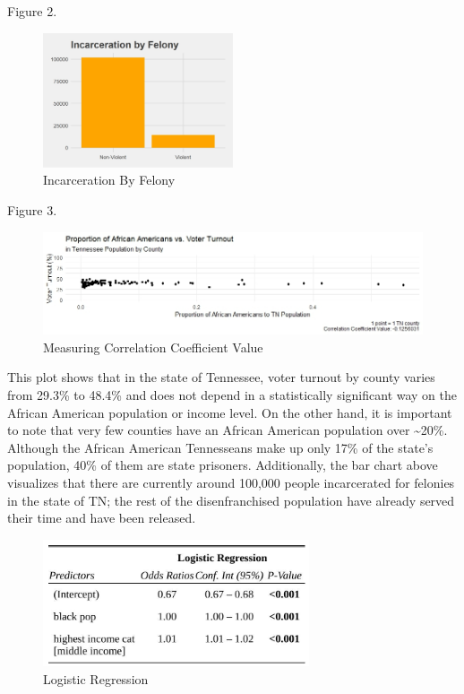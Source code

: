 \documentclass[12pt,]{tufte-handout}
\begin{document}
Figure 2.

\begin{figure}
\centering
\includegraphics[width=0.5\textwidth,height=\textheight]{plot plotototroto.jpeg}
\caption{Incarceration By Felony}
\end{figure}

Figure 3.

\begin{figure}
\centering
\includegraphics[width=4\textwidth,height=\textheight]{prop_aa_pop_vt.jpeg}
\caption{Measuring Correlation Coefficient Value}
\end{figure}

This plot shows that in the state of Tennessee, voter turnout by county
varies from 29.3\% to 48.4\% and does not depend in a statistically
significant way on the African American population or income level. On
the other hand, it is important to note that very few counties have an
African American population over \textasciitilde20\%. Although the
African American Tennesseans make up only 17\% of the state's
population, 40\% of them are state prisoners. Additionally, the bar
chart above visualizes that there are currently around 100,000 people
incarcerated for felonies in the state of TN; the rest of the
disenfranchised population have already served their time and have been
released.

\begin{figure}
\centering
\includegraphics[width=0.7\textwidth,height=\textheight]{tfdr2 (1).jpg}
\caption{Logistic Regression}
\end{figure}
\end{document}
